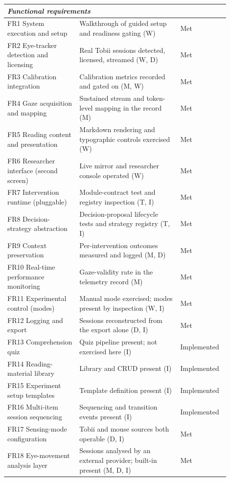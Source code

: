 \begin{longtable}{p{0.30\linewidth} p{0.42\linewidth} p{0.18\linewidth}}
\multicolumn{3}{l}{\textit{Functional requirements}} \\
\midrule
FR1 System execution and setup          & Walkthrough of guided setup and readiness gating (W) & Met \\
FR2 Eye-tracker detection and licensing & Real Tobii sessions detected, licensed, streamed (W, D) & Met \\
FR3 Calibration integration             & Calibration metrics recorded and gated on (M, W) & Met \\
FR4 Gaze acquisition and mapping        & Sustained stream and token-level mapping in the record (M) & Met \\
FR5 Reading content and presentation    & Markdown rendering and typographic controls exercised (W) & Met \\
FR6 Researcher interface (second screen) & Live mirror and researcher console operated (W) & Met \\
FR7 Intervention runtime (pluggable)    & Module-contract test and registry inspection (T, I) & Met \\
FR8 Decision-strategy abstraction       & Decision-proposal lifecycle tests and strategy registry (T, I) & Met \\
FR9 Context preservation                & Per-intervention outcomes measured and logged (M, D) & Met \\
FR10 Real-time performance monitoring   & Gaze-validity rate in the telemetry record (M) & Met \\
FR11 Experimental control (modes)       & Manual mode exercised; modes present by inspection (W, I) & Met \\
FR12 Logging and export                 & Sessions reconstructed from the export alone (D, I) & Met \\
FR13 Comprehension quiz                 & Quiz pipeline present; not exercised here (I) & Implemented \\
FR14 Reading-material library           & Library and CRUD present (I) & Implemented \\
FR15 Experiment setup templates         & Template definition present (I) & Implemented \\
FR16 Multi-item session sequencing      & Sequencing and transition events present (I) & Implemented \\
FR17 Sensing-mode configuration         & Tobii and mouse sources both operable (D, I) & Met \\
FR18 Eye-movement analysis layer        & Sessions analysed by an external provider; built-in present (M, D, I) & Met \\

\end{longtable}
